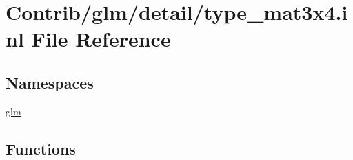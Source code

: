 \hypertarget{type__mat3x4_8inl}{}\section{Contrib/glm/detail/type\+\_\+mat3x4.inl File Reference}
\label{type__mat3x4_8inl}
\subsection*{Namespaces}
\begin{DoxyCompactItemize}
\item 
 \mbox{\hyperlink{namespaceglm}{glm}}
\end{DoxyCompactItemize}
\subsection*{Functions}
